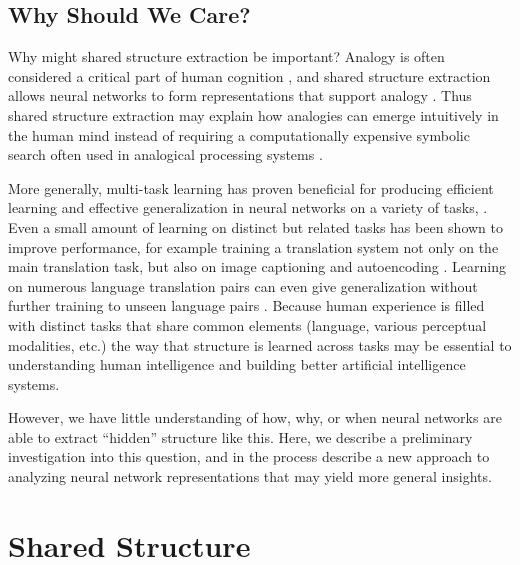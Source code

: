 \documentclass[10pt,letterpaper]{article}
\begin{document}
\subsection{Why Should We Care?}
Why might shared structure extraction be important? Analogy is often considered a critical part of human cognition \cite[e.g.]{Gentner2003}, and shared structure extraction allows neural networks to form representations that support analogy \citep{Pennington2014,Kollias2013}. Thus shared structure extraction may explain how analogies can emerge intuitively in the human mind instead of requiring a computationally expensive symbolic search often used in analogical processing systems \cite[e.g.]{Falkenhainer1989}. \par
More generally, multi-task learning has proven beneficial for producing efficient learning and effective generalization in neural networks on a variety of tasks, \cite[e.g.]{Dong2015,Rusu2015}. Even a small amount of learning on distinct but related tasks has been shown to improve performance, for example training a translation system not only on the main translation task, but also on image captioning and autoencoding \citep{Luong2016}. Learning on numerous language translation pairs can even give generalization without further training to unseen language pairs \citep{Johnson2016}. Because human experience is filled with distinct tasks that share common elements (language, various perceptual modalities, etc.) the way that structure is learned across tasks may be essential to understanding human intelligence and building better artificial intelligence systems.\par
However, we have little understanding of how, why, or when neural networks are able to extract ``hidden'' structure like this. Here, we describe a preliminary investigation into this question, and in the process describe a new approach to analyzing neural network representations that may yield more general insights. 
\section{Shared Structure}
\end{document}
